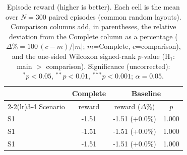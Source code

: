 \begin{table}[ht]
  \centering
  \caption{Episode reward (higher is better). Each cell is the mean over $N=300$ paired episodes (common random layouts). Comparison columns add, in parentheses, the relative deviation from the Complete column as a percentage ($\Delta\%=100\,(c-m)/|m|$; $m$=Complete, $c$=comparison), and the one-sided Wilcoxon signed-rank $p$-value (H$_1$: main $>$ comparison). Significance (uncorrected): $^{*}p<0.05$, $^{**}p<0.01$, $^{***}p<0.001$; $\alpha=0.05$.}
  \label{tab:wilcoxon-reward}
  \small
  \begin{tabular}{l c cc}
    \toprule
     & Complete & \multicolumn{2}{c}{Baseline} \\
    \cmidrule(lr){2-2}\cmidrule(lr){3-4}
    Scenario & {reward} & {reward ($\Delta$\%)} & {$p$} \\
    \midrule
    S1 & -1.51 & -1.51 (+0.0\%) & 1.000 \\
    S1 & -1.51 & -1.51 (+0.0\%) & 1.000 \\
    S1 & -1.51 & -1.51 (+0.0\%) & 1.000 \\
    \bottomrule
  \end{tabular}
\end{table}
